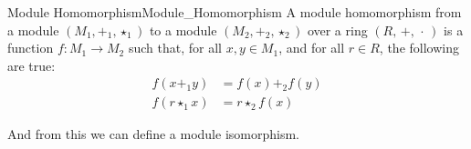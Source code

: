     \begin{fdefinition}{Module Homomorphism}{Module_Homomorphism}
        A \gls{module homomorphism} from a \gls{module}
        $(M_{1},\boldsymbol{+}_{1},\star_{1})$ to a module
        $(M_{2},\boldsymbol{+}_{2},\star_{2})$ over a \gls{ring}
        $(R,\,+,\,\cdot\,)$ is a \gls{function} $f:M_{1}\rightarrow{M}_{2}$
        such that, for all $x,y\in{M}_{1}$, and for all $r\in{R}$, the
        following are true:
        \begin{align}
            f(x\boldsymbol{+}_{1}y)&=f(x)\boldsymbol{+}_{2}f(y)
            \tag{Preservation of Addition}\\
            f(r\star_{1}{x})&=r\star_{2}f(x)
            \tag{Preservation of Scalar Multiplication}
        \end{align}
    \end{fdefinition}
    And from this we can define a module isomorphism.